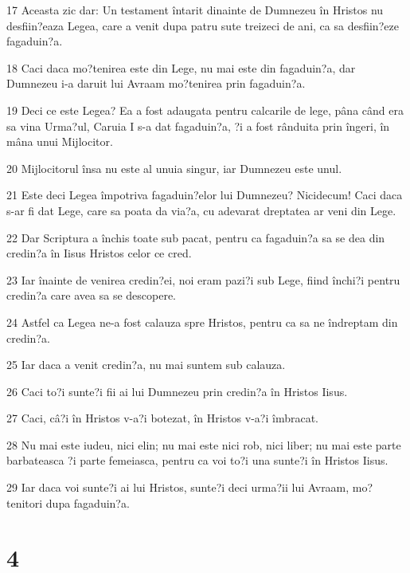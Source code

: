 \par 17 Aceasta zic dar: Un testament întarit dinainte de Dumnezeu în Hristos nu desfiin?eaza Legea, care a venit dupa patru sute treizeci de ani, ca sa desfiin?eze fagaduin?a.
\par 18 Caci daca mo?tenirea este din Lege, nu mai este din fagaduin?a, dar Dumnezeu i-a daruit lui Avraam mo?tenirea prin fagaduin?a.
\par 19 Deci ce este Legea? Ea a fost adaugata pentru calcarile de lege, pâna când era sa vina Urma?ul, Caruia I s-a dat fagaduin?a, ?i a fost rânduita prin îngeri, în mâna unui Mijlocitor.
\par 20 Mijlocitorul însa nu este al unuia singur, iar Dumnezeu este unul.
\par 21 Este deci Legea împotriva fagaduin?elor lui Dumnezeu? Nicidecum! Caci daca s-ar fi dat Lege, care sa poata da via?a, cu adevarat dreptatea ar veni din Lege.
\par 22 Dar Scriptura a închis toate sub pacat, pentru ca fagaduin?a sa se dea din credin?a în Iisus Hristos celor ce cred.
\par 23 Iar înainte de venirea credin?ei, noi eram pazi?i sub Lege, fiind închi?i pentru credin?a care avea sa se descopere.
\par 24 Astfel ca Legea ne-a fost calauza spre Hristos, pentru ca sa ne îndreptam din credin?a.
\par 25 Iar daca a venit credin?a, nu mai suntem sub calauza.
\par 26 Caci to?i sunte?i fii ai lui Dumnezeu prin credin?a în Hristos Iisus.
\par 27 Caci, câ?i în Hristos v-a?i botezat, în Hristos v-a?i îmbracat.
\par 28 Nu mai este iudeu, nici elin; nu mai este nici rob, nici liber; nu mai este parte barbateasca ?i parte femeiasca, pentru ca voi to?i una sunte?i în Hristos Iisus.
\par 29 Iar daca voi sunte?i ai lui Hristos, sunte?i deci urma?ii lui Avraam, mo?tenitori dupa fagaduin?a.

\chapter{4}

